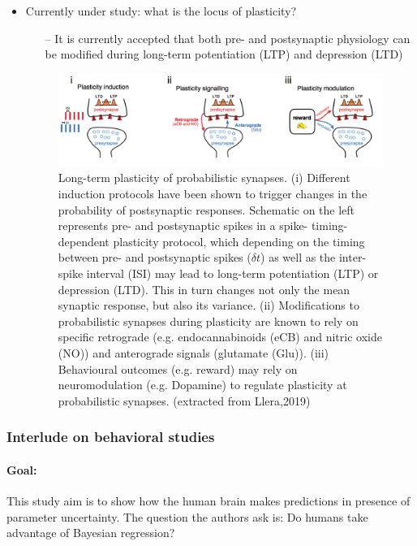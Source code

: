 \documentclass[main]{subfiles}
\begin{document}
\begin{itemize}
    \item Currently under study: what is the locus of plasticity? 
        \begin{itemize}
            \item [--] It is currently accepted that both pre- and postsynaptic physiology can be modified during long-term potentiation (LTP) and depression (LTD)
        \end{itemize}
        
     \begin{figure}[H]
    	\centering
    	\includegraphics[width=0.9\linewidth]{05_LearningAsBayesianInference/figures/longterm_plasticity.png}
    	\caption{Long-term plasticity of probabilistic synapses. (i) Different induction protocols have been shown to trigger changes in the probability of postsynaptic responses. Schematic on the left represents pre- and postsynaptic spikes in a spike- timing-dependent plasticity protocol, which depending on the timing between pre- and postsynaptic spikes ($\delta t$) as well as the inter-spike interval (ISI) may lead to long-term potentiation (LTP) or depression (LTD). This in turn changes not only the mean synaptic response, but also its variance. (ii) Modifications to probabilistic synapses during plasticity are known to rely on specific retrograde (e.g. endocannabinoids (eCB) and nitric oxide (NO)) and anterograde signals (glutamate (Glu)). (iii) Behavioural outcomes (e.g. reward) may rely on neuromodulation (e.g. Dopamine) to regulate plasticity at probabilistic synapses. (extracted from Llera,2019)} 
    	\label{fig:synaptic_tx}
    \end{figure}
\end{itemize}

\subsubsection{Interlude on behavioral studies}
\paragraph{Goal:} This study aim is to show how the human brain makes predictions in presence of parameter uncertainty. The question the authors ask is: Do humans take advantage of Bayesian regression?
\end{document}
